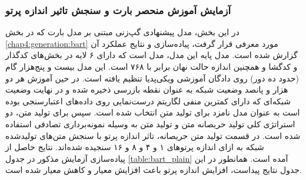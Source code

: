 \subsubsection{آزمایش آموزش منحصر بارت و سنجش تاثیر اندازه پرتو} \label{chap5:bart:plain}
در این بخش،‌ مدل پیشنهادی گپ‌زنی مبتنی بر مدل بارت که در بخش 
\ref{chap4:generation:bart}
مورد معرفی قرار گرفت، پیاده‌سازی و نتایج عملکرد آن گزارش شده است. مدل پایه این مدل، مدل 
است که دارای ۶ لایه در بخش‌های کدگذار و کدگشا و همچنین اندازه حالت نهان برابر با ۷۶۸ است. این مدل بیست و پنج‌هزار گام (حدود ده دور) روی دادگان آموزشی ویکی‌پدیا تنظیم یافته است. 
در حین آموزش هر دو هزار و پانصد وضعیت شبکه به عنوان نقطه بازرسی ذخیره شده و در نهایت وضعیت شبکه‌ای که دارای کمترین منفی لگاریتم درست‌نمایی روی داده‌های اعتبارسنجی بوده است به عنوان مدل نامزد برای تولید متن انتخاب شده است. 
سپس برای تولید متن،‌ دو استراتژی کلی تولید حریصانه متن و تولید متن به وسیله نمونه‌برداری تصادفی استفاده شده است. در قسمت تولید متن حریصانه، تاثر اندازه پرتو با سنجش متن‌های تولید‌شده شبکه به ازای اندازه پرتو‌های ۱ و ۴ و ۸ و ۱۶ سنجیده شده‌اند. نتایج حاصل از پیاده‌سازی آزمایش مذکور در جدول 
\ref{table:bart_plain}
آمده است. همانطور در این جدول نتایج پیداست، افزایش اندازه پرتو باعث افزایش معیار
و کاهش معیار 
شده است.



